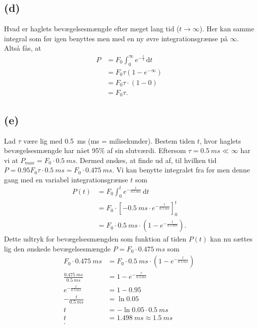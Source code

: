 \documentclass[12pt]{article}
\theoremstyle{definition}
\begin{document}
\subsection*{(d)}
Hvad er haglets bevægelsesmængde efter meget lang tid ($t \to \infty$).
\bigbreak
Her kan samme integral som før igen benyttes men med en ny øvre integrationsgrænse på $\infty$. Altså fås, at
\begin{align*}
  P &= F_0 \int_{0}^{\infty} e^{-\frac{t}{\tau}} \, \mathrm{d}t  \\
  &= F_{0}\tau \left( 1 - e^{-\infty } \right) \\
  &= F_0 \tau \cdot (1-0) \\
  &= F_0 \tau
.\end{align*}


\subsection*{(e)}
Lad $\tau$ være lig med \qty{0,5}{ms} (\unit{ms} = milisekunder). Bestem tiden $t$, hvor haglets bevægelsesmængde har nået 95\% af sin slutværdi.
\bigbreak
Eftersom $\tau = \qty{0,5}{ms} \ll \infty$ har vi at $P_{max} = F_0 \cdot \qty{0,5}{ms} $. Dermed ønskes, at finde ud af, til hvilken tid $P = \num{0,95} F_0 \tau \cdot \qty{0,5}{ms} = F_0 \cdot \qty{0,475}{ms}$. Vi kan benytte integralet fra før men denne gang med en variabel integrationsgrænse $t$ som
\begin{align*}
  P(t) &= F_0 \int_{0}^{t} e^{-\frac{t}{\qty{0,5}{ms}}} \, \mathrm{d}t \\
  &= F_0 \cdot \left[ -\qty{0,5}{ms} \cdot e^{-\frac{t}{\qty{0,5}{ms}}} \right]_0^{t} \\
  &= F_0 \cdot \qty{0,5}{ms} \cdot  \left( 1 - e^{-\frac{t}{\qty{0,5}{ms}}} \right)
.\end{align*}
Dette udtryk for bevægelsesmængden som funktion af tiden $P(t)$ kan nu sættes lig den ønskede bevægelsesmængde $P = F_0 \cdot \qty{0,475}{ms}$ som
\begin{align*}
  F_0 \cdot \qty{0,475}{ms} &= F_0 \cdot \qty{0,5}{ms} \cdot \left( 1-e^{-\frac{t}{\qty{0,5}{ms}}} \right) \\
  \frac{\qty{0,475}{ms} }{\qty{0,5}{ms}} &= 1 - e^{-\frac{t}{\qty{0,5}{ms}}} \\
  e^{-\frac{t}{\qty{0,5}{ms}}} &= 1- \num{0,95} \\ 
  -\frac{t}{\qty{0,5}{ms}} &= \ln \num{0,05} \\
  t &= - \ln \num{0,05} \cdot \qty{0,5}{ms}  \\
  t &= \qty{1,498}{ms} \approx \qty{1,5}{ms}  \\
.\end{align*}
\end{document}
